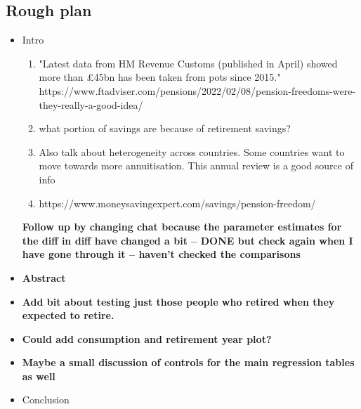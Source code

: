 \documentclass[12pt]{article}
\begin{document}
\subsection{Rough plan}
\begin{itemize}
    \item Intro
          \begin{enumerate}
              \item "Latest data from HM Revenue Customs (published in April)
                    showed more than £45bn has been taken from pots since 2015."
                    https://www.ftadviser.com/pensions/2022/02/08/pension-freedoms-were-they-really-a-good-idea/
              \item what portion of savings are because of retirement savings?
              \item Also talk about heterogeneity across countries. Some
                    countries want to move towards more annuitisation. This
                    annual review is a good source of info
                    \cite{banks_crawford_ar_2022}
              \item https://www.moneysavingexpert.com/savings/pension-freedom/
          \end{enumerate}

          \textbf{Follow up by changing chat because the parameter estimates for
              the diff in diff have changed a bit -- DONE but check again when I
              have gone through it -- haven't checked the comparisons }
    \item \textbf{Abstract}
    \item \textbf{Add bit about testing just those people who retired when they
              expected to retire.}
    \item \textbf{Could add consumption and retirement year plot?}
    \item \textbf{Maybe a small discussion of controls for the main regression
              tables as well}
    \item Conclusion
\end{itemize}





\end{document}
